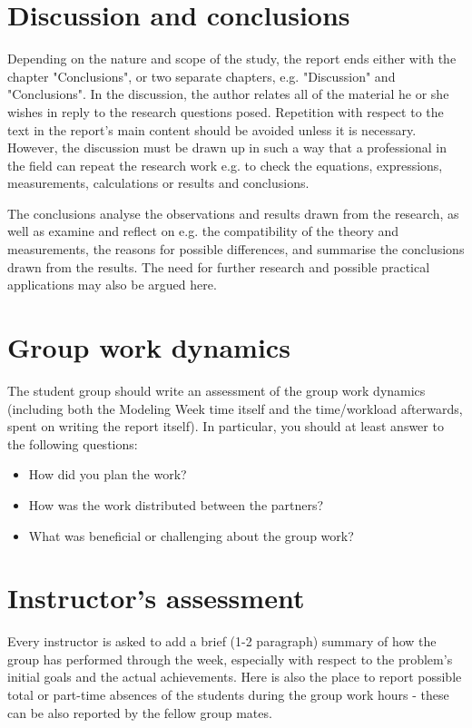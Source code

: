 \documentclass[12pt,oneside,a4paper]{article}
\begin{document}
\section{Discussion and conclusions}

Depending on the nature and scope of the study, the report ends either with the chapter
"Conclusions", or two separate chapters, e.g. "Discussion" and "Conclusions".
In the discussion, the author relates all of the
material he or she wishes in reply to the research questions posed. Repetition with respect to the text in the 
report's main content should be avoided unless it is necessary. However, the discussion must
be drawn up in such a way that a professional in the field can repeat the research work e.g. to check
the equations, expressions, measurements, calculations or results and conclusions. 

The conclusions analyse the observations and results drawn from the research, as well as examine and reflect
on e.g. the compatibility of the theory and measurements, the reasons for possible differences, and
summarise the conclusions drawn from the results. The need for further research and possible
practical applications may also be argued here.

\section{Group work dynamics}

The student group should write an assessment of the group work dynamics (including both the Modeling Week time itself and the time/workload afterwards, spent on writing the report itself). In particular, you should at least answer to the following questions:
\begin{itemize}
\item How did you plan the work? 
\item How was the work distributed between the partners?
\item What was beneficial or challenging about the group work?
\end{itemize}

\section{Instructor's assessment}

Every instructor is asked to add a brief (1-2 paragraph) summary of how the group has performed through the week, especially with respect to the problem's initial goals and the actual achievements. Here is also the place to report possible total or part-time absences of the students during the group work hours - these can be also reported by the fellow group mates.
\end{document}
